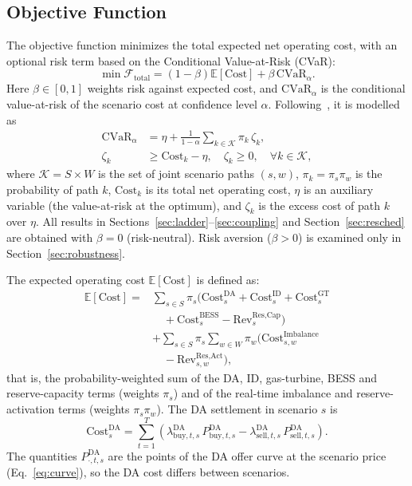 \documentclass[5p,times,twocolumn]{elsarticle}
\begin{document}
\subsection{Objective Function}
The objective function minimizes the total expected net operating cost, with an
optional risk term based on the Conditional Value-at-Risk (CVaR):
\begin{equation}
\min \mathcal{F}_{\text{total}}
= (1-\beta)\mathbb{E}[\text{Cost}]
+ \beta\,\mathrm{CVaR}_{\alpha}.
\label{eq:total_objective}
\end{equation}
Here $\beta\in[0,1]$ weights risk against expected cost, and
$\mathrm{CVaR}_{\alpha}$ is the conditional value-at-risk of the scenario cost
at confidence level $\alpha$. Following~\cite{rockafellar2000optimization}, it is modelled as
\begin{align}
  \mathrm{CVaR}_{\alpha} &= \eta + \frac{1}{1-\alpha}\sum_{k\in\mathcal{K}} \pi_k\,\zeta_k, \label{eq:cvar}\\
  \zeta_k &\ge \mathrm{Cost}_k - \eta, \quad \zeta_k \ge 0, \quad \forall k\in\mathcal{K}, \label{eq:cvar_aux}
\end{align}
where $\mathcal{K}=S\times W$ is the set of joint scenario paths $(s,w)$,
$\pi_k=\pi_s\pi_w$ is the probability of path $k$, $\mathrm{Cost}_k$ is its
total net operating cost, $\eta$ is an auxiliary variable (the value-at-risk at
the optimum), and $\zeta_k$ is the excess cost of path $k$ over $\eta$.
All results in Sections~\ref{sec:ladder}--\ref{sec:coupling} and
Section~\ref{sec:resched} are obtained with $\beta=0$ (risk-neutral). Risk
aversion ($\beta>0$) is examined only in Section~\ref{sec:robustness}.

The expected operating cost $\mathbb{E}[\text{Cost}]$ is defined as:
\begin{align}
\mathbb{E}[\text{Cost}]
={}& \sum_{s\in S}\pi_s \Big(
\text{Cost}_{s}^{\text{DA}} + \text{Cost}_{s}^{\text{ID}}
+ \text{Cost}_{s}^{\text{GT}} \nonumber\\
&\quad + \text{Cost}_{s}^{\text{BESS}}
- \text{Rev}_{s}^{\text{Res,Cap}}
\Big) \nonumber\\
&+ \sum_{s\in S}\pi_s\sum_{w\in W}\pi_w
\Big(
\text{Cost}_{s,w}^{\text{Imbalance}} \nonumber\\
&\quad - \text{Rev}_{s,w}^{\text{Res,Act}}
\Big),
\label{eq:expected_cost}
\end{align}
that is, the probability-weighted sum of the DA, ID, gas-turbine,
BESS and reserve-capacity terms (weights $\pi_s$) and of the real-time
imbalance and reserve-activation terms (weights $\pi_s\pi_w$). The DA
settlement in scenario $s$ is
\begin{equation}
\text{Cost}^{\text{DA}}_{s} = \sum_{t=1}^{T}\left(\lambda^{\text{DA}}_{\text{buy},t,s}\,P^{\text{DA}}_{\text{buy},t,s}
- \lambda^{\text{DA}}_{\text{sell},t,s}\,P^{\text{DA}}_{\text{sell},t,s}\right).
\label{eq:cost_da}
\end{equation}
The quantities $P^{\text{DA}}_{\cdot,t,s}$ are the points of the DA offer
curve at the scenario price (Eq.~\eqref{eq:curve}), so the DA cost
differs between scenarios.
\end{document}
